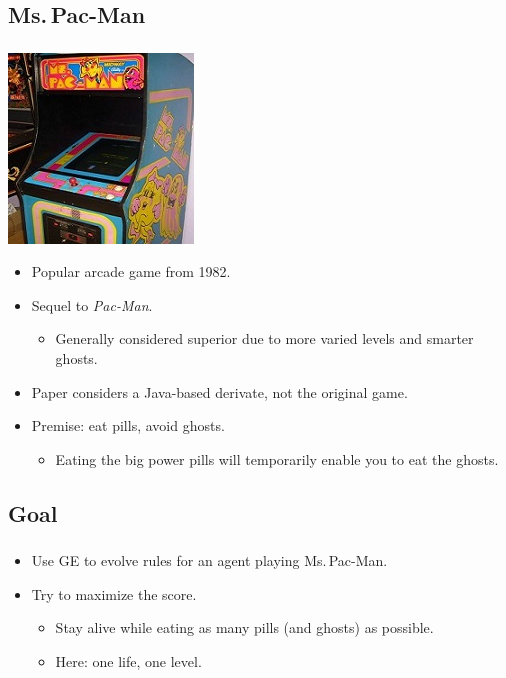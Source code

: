 \documentclass{beamer}
\makeatletter
\newcommand*{\currentname}{\@currentlabelname}
\makeatother
\begin{document}
\subsection{Ms.\,Pac-Man}
\begin{frame}
\frametitle{\currentname}
\begin{center}
	\includegraphics[scale=0.5]{mspacmankast.jpg}
\end{center}

\vspace*{-0.8cm}

\begin{itemize}
	\item Popular arcade game from 1982.
	\item Sequel to \textit{Pac-Man}. 
	\begin{itemize}
		\item Generally considered superior due to more varied levels and smarter ghosts.
	\end{itemize}
	\item Paper considers a Java-based derivate, not the original game.
	\item Premise: eat pills, avoid ghosts.
	\begin{itemize}
		\item Eating the big power pills will temporarily enable you to eat the ghosts.
	\end{itemize}
\end{itemize}

\vspace*{1.0cm}

\end{frame}

\subsection{Goal}
\begin{frame}
\frametitle{\currentname}

\begin{itemize}
	\item Use GE to evolve rules for an agent playing Ms.\,Pac-Man.
	\item Try to maximize the score.
	\begin{itemize}
		\item Stay alive while eating as many pills (and ghosts) as possible.
		\item Here: one life, one level.
	\end{itemize}
\end{itemize}

\end{frame}
\end{document}
